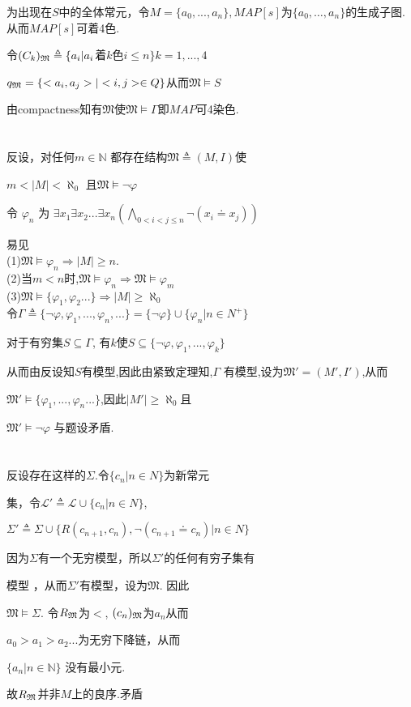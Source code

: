 \documentclass{article}
\begin{document}
为出现在$S$中的全体常元，令$M=\{a_0,...,a_n\},MAP[s]$为$\{a_0,\dots,a_n\}$的生成子图. 	从而$MAP[s]$可着4色. 

令$(C_{k})_\frak{M} \triangleq \{a_i|a_i$着$k$色$i\leq n\}k=1,...,4$

$q_\frak{M} =\{<a_i,a_j>|<i,j>\in Q\}$从而$\mathfrak{M} \vDash S$

由compactness知有$\mathfrak{M}$使$\mathfrak{M}\vDash \Gamma $即$MAP$可4染色.

\section{}
反设，对任何$m\in \mathbb{N}$ 都存在结构$\mathfrak{M} \triangleq (M,I)$使

$m <|M| < \aleph_0$ 且$\mathfrak{M}\vDash \neg  \varphi $

令 $\varphi_n$ 为 $\exists x_1 \exists x_2 ... \exists x_n (\bigwedge_{0<i<j\leq n}\neg (x_i \doteq x_j))$

易见\\
(1)$ \mathfrak{M}\vDash \varphi_n \Rightarrow |M|\geq n$. \\
(2)当$m<n$时,$\mathfrak{M}\vDash \varphi_n \Rightarrow \mathfrak{M}\vDash \varphi_m$ \\
(3)$\mathfrak{M}\vDash \{\varphi_1,\varphi_2...\} \Rightarrow |M|\geq \aleph_0$
\\
令$\Gamma \triangleq \{ \neg  \varphi, \varphi_1, ..., \varphi_n ,...\} = \{ \neg \varphi \}\cup \{\varphi_n |n \in N^+\}$

对于有穷集$S \subseteq \Gamma$, 有$k$使$S\subseteq \{ \neg  \varphi, \varphi_1, ..., \varphi_k\} $

从而由反设知$S$有模型,因此由紧致定理知,$\Gamma$ 有模型,设为$\mathfrak{M'} = (M',I')$,从而

$\mathfrak{M'}\vDash \{\varphi_1, ..., \varphi_n...\}$,因此$|M'|\geq \aleph_0$且

$\mathfrak{M'} \vDash \neg \varphi$ 与题设矛盾.


\section{}

反设存在这样的$\Sigma$.令$\{c_n|n \in N\}$为新常元

集，令$\mathscr{L'}\triangleq \mathscr{L} \cup \{c_n | n \in N\}$,

$\Sigma' \triangleq \Sigma \cup \{R (c_{n+1},c_n),\neg (c_{n+1}\doteq c_n)| n\in N\}$


因为$\Sigma$有一个无穷模型，所以$\Sigma'$的任何有穷子集有

模型 ，从而$\Sigma'$有模型，设为$\mathfrak{M}$. 因此

$\mathfrak{M} \vDash \Sigma$. 令$R_\frak{M}$为$<$, $(c_n)_\frak{M}$为$a_n$从而

$a_0>a_1>a_2...$为无穷下降链，从而

$\{a_n | n \in \mathbb{N}\}$ 没有最小元.

故$R_\frak{M}$并非$M$上的良序.矛盾
\end{document}
